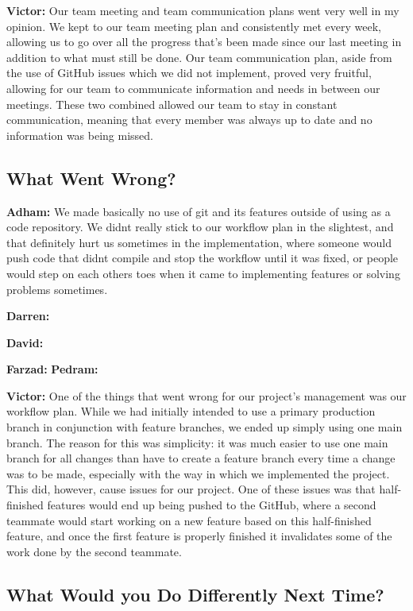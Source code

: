 \documentclass{article}
\begin{document}
\textbf{Victor:} Our team meeting and team communication plans went very well in my opinion. We kept to our team meeting plan and consistently met every week, 
allowing us to go over all the progress that's been made since our last meeting in addition to what must still be done. Our team communication plan, aside from the use of 
GitHub issues which we did not implement, proved very fruitful, allowing for our team to communicate information and needs in between our meetings. These two combined allowed 
our team to stay in constant communication, meaning that every member was always up to date and no information was being missed.

\subsection{What Went Wrong?}

\textbf{Adham:} We made basically no use of git and its features outside of using as a code repository. We didnt really stick to our workflow plan in the slightest, and that
definitely hurt us sometimes in the implementation, where someone would push code that didnt compile and stop the workflow until it was fixed, or people would step on each others
toes when it came to implementing features or solving problems sometimes.

\textbf{Darren:}

\textbf{David:}

\textbf{Farzad:}
\textbf{Pedram:}

\textbf{Victor:} One of the things that went wrong for our project's management was our workflow plan. While we had initially intended to use a primary production branch in 
conjunction with feature branches, we ended up simply using one main branch. The reason for this was simplicity: it was much easier to use one main branch for all changes than
have to create a feature branch every time a change was to be made, especially with the way in which we implemented the project. This did, however, cause issues for our project.
One of these issues was that half-finished features would end up being pushed to the GitHub, where a second teammate would start working on a new feature based on this 
half-finished feature, and once the first feature is properly finished it invalidates some of the work done by the second teammate.

\subsection{What Would you Do Differently Next Time?}
\end{document}
